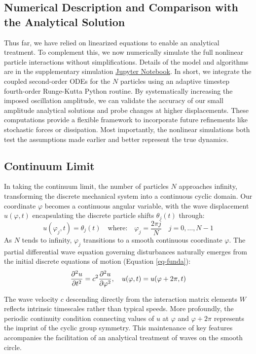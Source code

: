 \documentclass[final,5p,times,twocolumn,authoryear]{elsarticle}
\begin{document}
\subsection{Numerical Description and Comparison with the Analytical Solution}
Thus far, we have relied on linearized equations to enable an analytical treatment. To complement this, we now numerically simulate the full nonlinear particle interactions without simplifications. Details of the model and algorithms are in the supplementary simulation \href{https://github.com/a-samea/Waves-CourseProject/blob/main/Simulations/N%20Particle.ipynb}{Jupyter Notebook}. In short, we integrate the coupled second-order ODEs for the $N$ particles using an adaptive timestep fourth-order Runge-Kutta Python routine. By systematically increasing the imposed oscillation amplitude, we can validate the accuracy of our small amplitude analytical solutions and probe changes at higher displacements. These computations provide a flexible framework to incorporate future refinements like stochastic forces or dissipation. Most importantly, the nonlinear simulations both test the assumptions made earlier and better represent the true dynamics.

\subsection{Continuum Limit}
In taking the continuum limit, the number of particles $N$ approaches infinity, transforming the discrete mechanical system into a continuous cyclic domain. Our coordinate $\varphi$ becomes a continuous angular variable, with the wave displacement $u(\varphi,t)$ encapsulating the discrete particle shifts $\theta_j(t) $ through:
\[ u(\varphi_j,t) = \theta_j(t) \quad \text{where:} \quad \varphi_j=\frac{2\pi j}{N} \quad j = 0,\dots,N-1 \]
As $N$ tends to infinity, $\varphi_j$ transitions to a smooth continuous coordinate $\varphi$. The partial differential wave equation governing disturbances naturally emerges from the initial discrete equations of motion (Equation \ref{eq-funda}):
\begin{equation}
	\pdv[order={2}]{u}{t} = c^2 \pdv[order={2}]{u}{\varphi}, \quad u(\varphi,t) = u(\varphi+2\pi,t)
	\label{eq-waveperiodic}
\end{equation}

The wave velocity $c$ descending directly from the interaction matrix elements $W$ reflects intrinsic timescales rather than typical speeds. More profoundly, the periodic continuity condition connecting values of $u $ at $\varphi$ and $\varphi+2\pi$ represents the imprint of the cyclic group symmetry. This maintenance of key features accompanies the facilitation of an analytical treatment of waves on the smooth circle.
\end{document}
